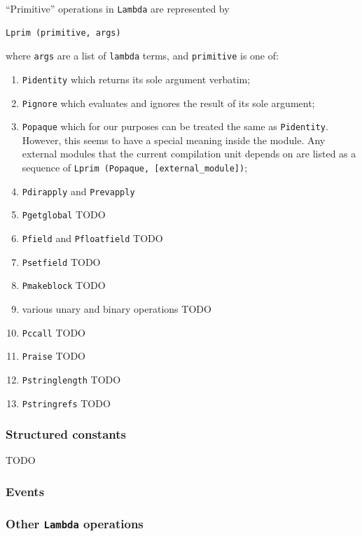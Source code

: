 \documentclass[12pt,a4paper,twoside,openright]{report}
\begin{document}
``Primitive'' operations in \lstinline!Lambda! are represented by
\begin{lstlisting}
Lprim (primitive, args)\end{lstlisting}
where \lstinline!args! are a list of \lstinline!lambda! terms, and \lstinline!primitive! is one of:
\begin{enumerate}
  \item \lstinline!Pidentity! which returns its sole argument verbatim;
  \item \lstinline!Pignore! which evaluates and ignores the result of its sole argument;
  \item \lstinline!Popaque! which for our purposes can be treated the same as
    \lstinline!Pidentity!. However, this seems to have a special meaning inside
    the module. Any external modules that the current compilation unit
    depends on are listed as a sequence of
    \lstinline!Lprim (Popaque, [external_module])!;
  \item \lstinline!Pdirapply! and \lstinline!Prevapply! 
  \item \lstinline!Pgetglobal! TODO
  \item \lstinline!Pfield! and \lstinline!Pfloatfield! TODO
  \item \lstinline!Psetfield! TODO
  \item \lstinline!Pmakeblock! TODO
  \item various unary and binary operations TODO
  \item \lstinline!Pccall! TODO
  \item \lstinline!Praise! TODO
  \item \lstinline!Pstringlength! TODO
  \item \lstinline!Pstringrefs! TODO
\end{enumerate}

\subsubsection{Structured constants}

TODO

\subsubsection{Events}

\subsubsection{Other \texttt{Lambda} operations}
\end{document}
